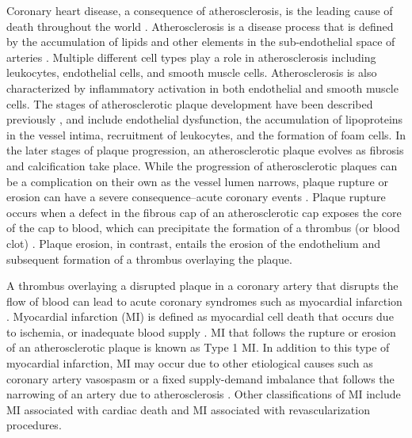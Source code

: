 \begin{DoubleSpace*}
Coronary heart disease, a consequence of atherosclerosis, is the leading cause of death throughout the world \cite{benjamin2017}. Atherosclerosis is a disease process that is defined by the accumulation of lipids and other elements in the sub-endothelial space of arteries \cite{tabas2015,falk2005,lusis2000}. Multiple different cell types play a role in atherosclerosis including leukocytes, endothelial cells, and smooth muscle cells. Atherosclerosis is also characterized by inflammatory activation in both endothelial and smooth muscle cells. The stages of atherosclerotic plaque development have been described previously \cite{stoll2006}, and include endothelial dysfunction, the accumulation of lipoproteins in the vessel intima, recruitment of leukocytes, and the formation of foam cells. In the later stages of plaque progression, an atherosclerotic plaque evolves as fibrosis and calcification take place. While the progression of atherosclerotic plaques can be a complication on their own as the vessel lumen narrows, plaque rupture or erosion can have a severe consequence--acute coronary events \cite{arbab2012}. Plaque rupture occurs when a defect in the fibrous cap of an atherosclerotic cap exposes the core of the cap to blood, which can precipitate the formation of a thrombus (or blood clot) \cite{bentzon2014}. Plaque erosion, in contrast, entails the erosion of the endothelium and subsequent formation of a thrombus overlaying the plaque. 

A thrombus overlaying a disrupted plaque in a coronary artery that disrupts the flow of blood can lead to acute coronary syndromes such as myocardial infarction \cite{arbab2012}. Myocardial infarction (MI) is defined as myocardial cell death that occurs due to ischemia, or inadequate blood supply \cite{thygesen2012}. MI that follows the rupture or erosion of an atherosclerotic plaque is known as Type 1 MI. In addition to this type of myocardial infarction, MI may occur due to other etiological causes such as coronary artery vasospasm or a fixed supply-demand imbalance that follows the narrowing of an artery due to atherosclerosis \cite{thygesen2012}. Other classifications of MI include MI associated with cardiac death and MI associated with revascularization procedures.


\end{DoubleSpace*}
